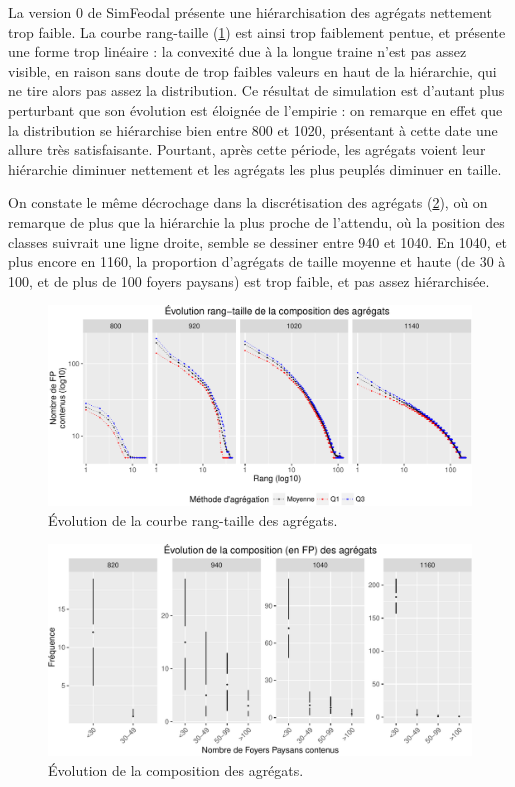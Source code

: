 \documentclass[12pt, a4paper, oneside]{book}
\begin{document}
	\begin{mdframed}[backgroundcolor=gray!10,footnoteinside=false]
		La version 0 de SimFeodal présente une hiérarchisation des agrégats nettement trop faible. La courbe rang-taille (\cref{fig:rt-agregats-v0}) est ainsi trop faiblement pentue, et présente une forme trop linéaire : la convexité due à la longue traine n'est pas assez visible, en raison sans doute de trop faibles valeurs  en haut de la hiérarchie, qui ne \og tire\fg{} alors pas assez la distribution.
		Ce résultat de simulation est d'autant plus perturbant que son évolution est éloignée de l'empirie : on remarque en effet que la distribution se hiérarchise bien entre 800 et 1020, présentant à cette date une allure très satisfaisante. Pourtant, après cette période, les agrégats voient leur hiérarchie diminuer nettement et les agrégats les plus peuplés diminuer en taille.
		
		On constate le même décrochage dans la discrétisation des agrégats (\cref{fig:compo-agregats-v0}), où on remarque de plus que la hiérarchie la plus proche de l'attendu, où la position des classes suivrait une ligne droite, semble se dessiner entre 940 et 1040. En 1040, et plus encore en 1160, la proportion d'agrégats de taille moyenne et haute (de 30 à 100, et de plus de 100 foyers paysans) est trop faible, et pas assez hiérarchisée.
		
	\end{mdframed}
	
		\begin{figure}[H]
			\captionsetup{width=\linewidth}
			\includegraphics[width=.8\linewidth]{img/resultats/v0_rt_agregats.pdf}
			\caption{Évolution de la courbe rang-taille des agrégats.} 
			\label{fig:rt-agregats-v0} 
		\end{figure}
	
		\begin{figure}[H]
		\captionsetup{width=\linewidth}
		\includegraphics[width=.8\linewidth]{img/resultats/v0_compo_agregats.pdf}
		\caption{Évolution de la composition des agrégats.} 
		\label{fig:compo-agregats-v0} 
	\end{figure}
	
\end{document}
